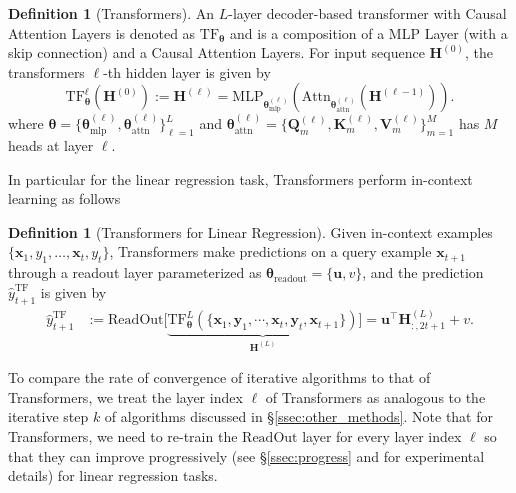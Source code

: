\documentclass[11pt]{article}
\theoremstyle{plain}
\theoremstyle{definition}
\newtheorem{definition}[theorem]{Definition}
\theoremstyle{remark}
\renewcommand{\^}[1]{^{(#1)}}
\newcommand{\bx}{\boldsymbol{x}}
\newcommand{\bK}{\boldsymbol{K}}
\newcommand{\bu}{\boldsymbol{u}}
\newcommand{\by}{\boldsymbol{y}}
\newcommand{\bH}{\boldsymbol{H}}
\newcommand{\bQ}{\boldsymbol{Q}}
\newcommand{\bV}{\boldsymbol{V}}
\newcommand{\btheta}{\boldsymbol{\theta}}
\newcommand{\new}[1]{{\color{black} {#1}}}
\begin{document}
\begin{definition}[Transformers]
    An $L$-layer decoder-based transformer with Causal Attention Layers is denoted as $\mathrm{TF}_{\btheta}$ and is a composition of a MLP Layer (with a skip connection) and a Causal Attention Layers. For input sequence $\bH^{(0)}$, the transformers $\ell$-th hidden layer is given by
    \begin{equation}
      \mathrm{TF}_{\btheta}^{\ell}(\bH^{(0)}) :=  \bH^{(\ell)} = \mathrm{MLP}_{\btheta_\mathrm{mlp}^{(\ell)}} \left(\mathrm{Attn}_{\btheta_\mathrm{attn}^{(\ell)}} (\bH^{(\ell-1)})\right). \nonumber
    \end{equation}
    where $\btheta = \{\btheta_\mathrm{mlp}^{(\ell)}, \btheta_\mathrm{attn}^{(\ell)}\}_{\ell=1}^L$ and $\btheta_\mathrm{attn}^{(\ell)} = \{\bQ_m^{(\ell)}, \bK_m^{(\ell)}, \bV_m^{(\ell)}\}_{m=1}^M$ has $M$ heads at layer $\ell$. 
\label{def:transformers}
\end{definition}

In particular for the linear regression task, Transformers perform in-context learning as follows
\begin{definition}[Transformers for Linear Regression] \label{def:readout}
Given in-context examples $\{\bx_1, y_1, \dotsc, \bx_t, y_t\}$, Transformers make predictions on a query example $\bx_{t+1}$  through a readout layer parameterized as $\btheta_{\mathrm{readout}} = \{\bu, v\}$, and the prediction $\hat{y}_{t+1}^{\mathrm{TF}} $ is given by
\begin{align*}
    \hat{y}_{t+1}^{\mathrm{TF}} &:= \mathrm{ReadOut} \Big[\underbrace{\mathrm{TF}_{\btheta}^L (\{\bx_1, \by_1, \cdots, \bx_t, \by_t, \bx_{t+1}\})}_{\bH^{(L)}} \Big] = \bu^\top \bH^{(L)}_{:,2t+1} + v.
\end{align*}
\end{definition}

\new{To compare the rate of convergence of iterative algorithms to that of Transformers, we treat the layer index $\ell$ of Transformers as analogous to the iterative step $k$ of algorithms discussed in \S \ref{ssec:other_methods}. Note that for Transformers, we need to re-train the $\mathrm{ReadOut}$ layer for every layer index $\ell$ so that they can improve progressively (see \S\ref{ssec:progress} and for experimental details) for linear regression tasks.}
\end{document}
